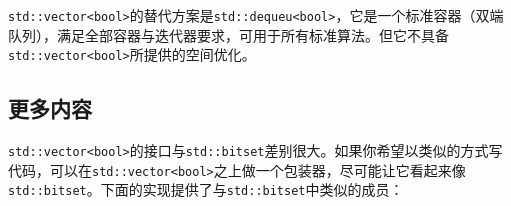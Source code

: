 
\begin{myNote}[tip]
\texttt{std::\allowbreak{}vector<\allowbreak{}bool>}的替代方案是\texttt{std::\allowbreak{}dequeu<\allowbreak{}bool>}，它是一个标准容器（双端队列），满足全部容器与迭代器要求，可用于所有标准算法。但它不具备\texttt{std::\allowbreak{}vector<\allowbreak{}bool>}所提供的空间优化。
\end{myNote}



\subsection{更多内容}



\texttt{std::\allowbreak{}vector<\allowbreak{}bool>}的接口与\texttt{std::\allowbreak{}bitset}差别很大。如果你希望以类似的方式写代码，可以在\texttt{std::\allowbreak{}vector<\allowbreak{}bool>}之上做一个包装器，尽可能让它看起来像\texttt{std::\allowbreak{}bitset}。下面的实现提供了与\texttt{std::\allowbreak{}bitset}中类似的成员：



